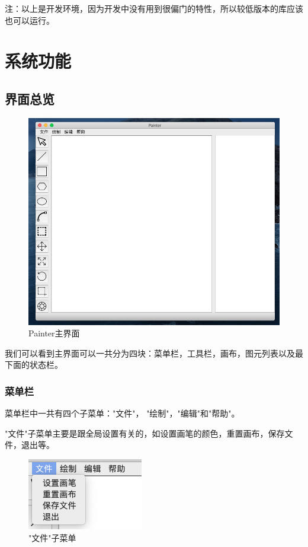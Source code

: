 \documentclass[11pt, a4paper, UTF8]{ctexart}
\begin{document}
注：以上是开发环境，因为开发中没有用到很偏门的特性，所以较低版本的库应该也可以运行。


\section{系统功能}


\subsection{界面总览}

\begin{figure}[H]
    \centering
    \includegraphics[scale=0.5]{Painter.png}
    \caption{Painter主界面}
\end{figure}

我们可以看到主界面可以一共分为四块：菜单栏，工具栏，画布，图元列表以及最下面的状态栏。


\subsubsection{菜单栏}

菜单栏中一共有四个子菜单："文件"， "绘制"，"编辑"和"帮助"。

"文件"子菜单主要是跟全局设置有关的，如设置画笔的颜色，重置画布，保存文件，退出等。

\begin{figure}[H]
    \centering
    \includegraphics[scale=1.5]{menu_file.png}
    \caption{"文件"子菜单}
\end{figure}
\end{document}
